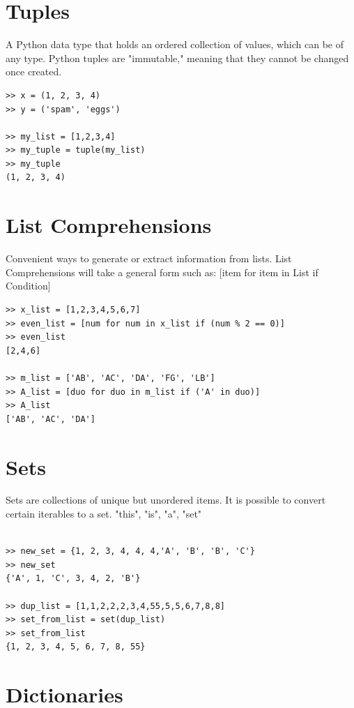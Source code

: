 \documentclass[12pt,a4paper,final,twoside,onecolumn,titlepage]{book}
\begin{document}
\section{Tuples}
A Python data type that holds an ordered collection of values, which can be of any type. Python tuples are "immutable," meaning that they cannot be changed once created. 
\lstset{language=Python, tabsize=4}
\begin{lstlisting}
>> x = (1, 2, 3, 4)
>> y = ('spam', 'eggs')

>> my_list = [1,2,3,4]
>> my_tuple = tuple(my_list)
>> my_tuple
(1, 2, 3, 4)
\end{lstlisting}


\section{List Comprehensions}

Convenient ways to generate or extract information from lists. List Comprehensions will take a general form such as: [item for item in List if Condition]

\lstset{language=Python, tabsize=4}
\begin{lstlisting}
>> x_list = [1,2,3,4,5,6,7]
>> even_list = [num for num in x_list if (num % 2 == 0)]
>> even_list
[2,4,6]

>> m_list = ['AB', 'AC', 'DA', 'FG', 'LB']
>> A_list = [duo for duo in m_list if ('A' in duo)]
>> A_list
['AB', 'AC', 'DA']
\end{lstlisting}

\section{Sets}

Sets are collections of unique but unordered items. It is possible to convert certain iterables to a set. {"this", "is", "a", "set"}

\lstset{language=Python, tabsize=4}
\begin{lstlisting}

>> new_set = {1, 2, 3, 4, 4, 4,'A', 'B', 'B', 'C'}
>> new_set
{'A', 1, 'C', 3, 4, 2, 'B'}

>> dup_list = [1,1,2,2,2,3,4,55,5,5,6,7,8,8]
>> set_from_list = set(dup_list)
>> set_from_list
{1, 2, 3, 4, 5, 6, 7, 8, 55}
\end{lstlisting}

\section{Dictionaries}
\end{document}
